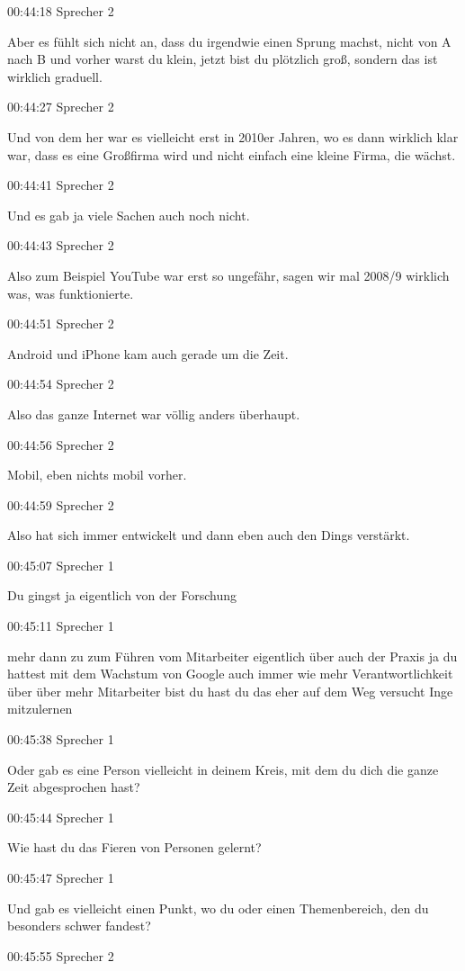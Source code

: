 00:44:18 Sprecher 2

Aber es fühlt sich nicht an, dass du irgendwie einen Sprung machst,
nicht von A nach B und vorher warst du klein, jetzt bist du plötzlich
groß, sondern das ist wirklich graduell.

00:44:27 Sprecher 2

Und von dem her war es vielleicht erst in 2010er Jahren, wo es dann
wirklich klar war, dass es eine Großfirma wird und nicht einfach eine
kleine Firma, die wächst.

00:44:41 Sprecher 2

Und es gab ja viele Sachen auch noch nicht.

00:44:43 Sprecher 2

Also zum Beispiel YouTube war erst so ungefähr, sagen wir mal 2008/9
wirklich was, was funktionierte.

00:44:51 Sprecher 2

Android und iPhone kam auch gerade um die Zeit.

00:44:54 Sprecher 2

Also das ganze Internet war völlig anders überhaupt.

00:44:56 Sprecher 2

Mobil, eben nichts mobil vorher.

00:44:59 Sprecher 2

Also hat sich immer entwickelt und dann eben auch den Dings verstärkt.

00:45:07 Sprecher 1

Du gingst ja eigentlich von der Forschung

00:45:11 Sprecher 1

mehr dann zu zum Führen vom Mitarbeiter eigentlich über auch der Praxis
ja du hattest mit dem Wachstum von Google auch immer wie mehr
Verantwortlichkeit über über mehr Mitarbeiter bist du hast du das eher
auf dem Weg versucht Inge mitzulernen

00:45:38 Sprecher 1

Oder gab es eine Person vielleicht in deinem Kreis, mit dem du dich die
ganze Zeit abgesprochen hast?

00:45:44 Sprecher 1

Wie hast du das Fieren von Personen gelernt?

00:45:47 Sprecher 1

Und gab es vielleicht einen Punkt, wo du oder einen Themenbereich, den
du besonders schwer fandest?

00:45:55 Sprecher 2

